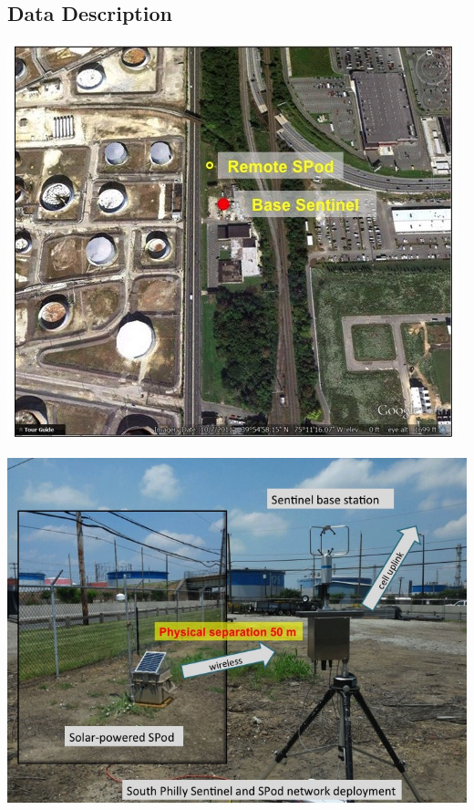 \documentclass[a0, landscape]{a0poster}
\begin{document}
\begin{multicols}{3}
\section*{Data Description}
\begin{minipage}{.14\textwidth}
	\begin{center}
		\includegraphics[width=\linewidth]{Slide11}
	\end{center}
\end{minipage}%
\hfill
\begin{minipage}{.14\textwidth}
	\begin{center}	
		\includegraphics[width=\linewidth]{Slide12}			

\end{center}
\end{minipage}
\end{multicols}
\end{document}
